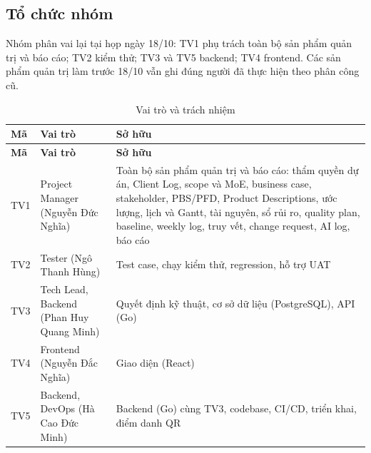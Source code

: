 \subsection*{Tổ chức nhóm}

Nhóm phân vai lại tại họp ngày 18/10: TV1 phụ trách toàn bộ sản phẩm quản trị và báo cáo; TV2 kiểm thử; TV3 và TV5 backend; TV4 frontend. Các sản phẩm quản trị làm trước 18/10 vẫn ghi đúng người đã thực hiện theo phân công cũ.

\begingroup\tblsetup\tblzebra
\begin{longtable}{L{1.2cm}L{4.0cm}L{8.8cm}}
\caption{Vai trò và trách nhiệm}\label{tab:roles}\\
\toprule
{}\textbf{Mã} & \textbf{Vai trò} & \textbf{Sở hữu} \\
\midrule
\endfirsthead
\toprule
{}\textbf{Mã} & \textbf{Vai trò} & \textbf{Sở hữu} \\
\midrule
\endhead
\bottomrule
\endlastfoot
TV1 & Project Manager (Nguyễn Đức Nghĩa) & Toàn bộ sản phẩm quản trị và báo cáo: thẩm quyền dự án, Client Log, scope và MoE, business case, stakeholder, PBS/PFD, Product Descriptions, ước lượng, lịch và Gantt, tài nguyên, sổ rủi ro, quality plan, baseline, weekly log, truy vết, change request, AI log, báo cáo \\
TV2 & Tester (Ngô Thanh Hùng) & Test case, chạy kiểm thử, regression, hỗ trợ UAT \\
TV3 & Tech Lead, Backend (Phan Huy Quang Minh) & Quyết định kỹ thuật, cơ sở dữ liệu (PostgreSQL), API (Go) \\
TV4 & Frontend (Nguyễn Đắc Nghĩa) & Giao diện (React) \\
TV5 & Backend, DevOps (Hà Cao Đức Minh) & Backend (Go) cùng TV3, codebase, CI/CD, triển khai, điểm danh QR \\
\end{longtable}
\endgroup

